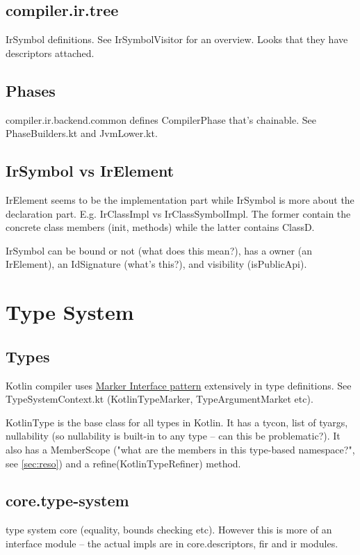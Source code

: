 \documentclass{article}
\begin{document}
\subsection{compiler.ir.tree}
IrSymbol definitions. See IrSymbolVisitor for an overview. Looks that they have descriptors attached.

\subsection{Phases}
compiler.ir.backend.common defines CompilerPhase that's chainable. See PhaseBuilders.kt and JvmLower.kt.

\subsection{IrSymbol vs IrElement}
IrElement seems to be the implementation part while IrSymbol is more about the declaration part. E.g. IrClassImpl vs IrClassSymbolImpl. The former contain the concrete class members (init, methods) while the latter contains ClassD.

IrSymbol can be bound or not (what does this mean?), has a owner (an IrElement), an IdSignature (what's this?), and visibility (isPublicApi).


\section{Type System}

\subsection{Types}

Kotlin compiler uses \href{https://en.wikipedia.org/wiki/Marker_interface_pattern}{Marker Interface pattern} extensively in type definitions. See TypeSystemContext.kt (KotlinTypeMarker, TypeArgumentMarket etc).

KotlinType is the base class for all types in Kotlin. It has a tycon, list of tyargs, nullability (so nullability is built-in to any type -- can this be problematic?). It also has a MemberScope ("what are the members in this type-based namespace?", see \ref{sec:reso}) and a refine(KotlinTypeRefiner) method.

\subsection{core.type-system}

type system core (equality, bounds checking etc). However this is more of an interface module -- the actual impls are in core.descriptors, fir and ir modules.
\end{document}
